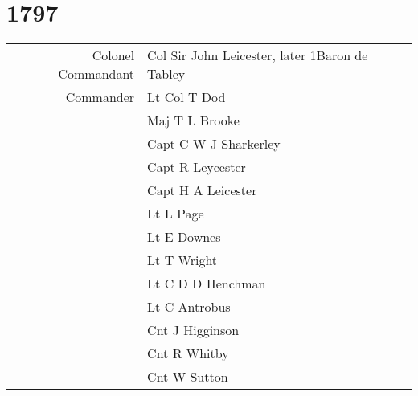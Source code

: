 \chapter*{1797}

\vspace*{10mm}

\begin{center}
  \begin{tabular}{rl}
    Colonel Commandant & Col Sir John Leicester, later 1\st Baron de Tabley \\
    Commander & Lt Col T Dod \\
    & Maj T L Brooke \\
    & Capt C W J Sharkerley \\
    & Capt R Leycester \\
    & Capt H A Leicester \\
    & Lt L Page \\
    & Lt E Downes \\
    & Lt T Wright \\
    & Lt C D D Henchman \\
    & Lt C Antrobus \\
    & Cnt J Higginson \\
    & Cnt R Whitby \\
    & Cnt W Sutton \\
  \end{tabular}
\end{center}
